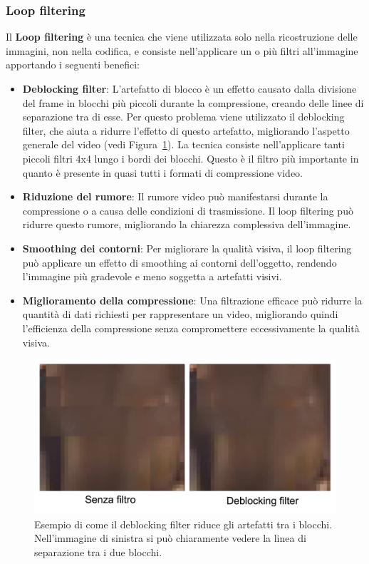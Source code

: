\documentclass[a4paper,12pt, oneside]{article}
\begin{document}
\subsubsection{Loop filtering}
Il \textbf{Loop filtering} è una tecnica che viene utilizzata solo nella ricostruzione delle immagini,
non nella codifica, e consiste nell'applicare un o più filtri all'immagine apportando i seguenti benefici:

\begin{itemize}
    \item \textbf{Deblocking filter}: L'artefatto di blocco è un effetto causato dalla divisione del frame
    in blocchi più piccoli durante la compressione, creando delle linee di separazione tra di esse.
    Per questo problema viene utilizzato il deblocking filter, che aiuta a ridurre l'effetto di questo
    artefatto, migliorando l'aspetto generale del video (vedi Figura~\ref{fig:deblocking_filter}). La
    tecnica consiste nell'applicare tanti piccoli filtri 4x4 lungo i bordi dei blocchi.
    Questo è il filtro più importante in quanto è presente in quasi tutti i formati di compressione video.
    \item \textbf{Riduzione del rumore}: Il rumore video può manifestarsi durante la compressione
    o a causa delle condizioni di trasmissione. Il loop filtering può ridurre questo rumore,
    migliorando la chiarezza complessiva dell'immagine.
    \item \textbf{Smoothing dei contorni}: Per migliorare la qualità visiva, il loop filtering può
    applicare un effetto di smoothing ai contorni dell'oggetto, rendendo l'immagine più gradevole e
    meno soggetta a artefatti visivi.
    \item \textbf{Miglioramento della compressione}: Una filtrazione efficace può ridurre la quantità
    di dati richiesti per rappresentare un video, migliorando quindi l'efficienza della compressione
    senza compromettere eccessivamente la qualità visiva.
\end{itemize}

\begin{figure}[h]
    \centering
    \includegraphics[width=1\textwidth]{images/deblocking-filter.png}
    \caption{Esempio di come il deblocking filter riduce gli artefatti tra i blocchi. Nell'immagine di
    sinistra si può chiaramente vedere la linea di separazione tra i due blocchi.}
    \label{fig:deblocking_filter}
\end{figure}
\end{document}
